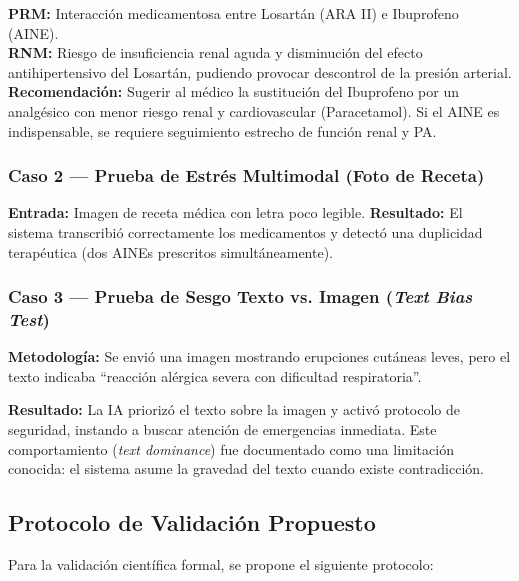 \documentclass[12pt,a4paper]{article}
\begin{document}
\begin{infobox}
  \textbf{PRM:} Interacción medicamentosa entre Losartán (ARA II) e Ibuprofeno (AINE).\\
  \textbf{RNM:} Riesgo de insuficiencia renal aguda y disminución del efecto antihipertensivo del
  Losartán, pudiendo provocar descontrol de la presión arterial.\\
  \textbf{Recomendación:} Sugerir al médico la sustitución del Ibuprofeno por un analgésico con
  menor riesgo renal y cardiovascular (Paracetamol). Si el AINE es indispensable, se requiere
  seguimiento estrecho de función renal y PA.
\end{infobox}

\subsubsection{Caso 2 --- Prueba de Estrés Multimodal (Foto de Receta)}
\textbf{Entrada:} Imagen de receta médica con letra poco legible.
\textbf{Resultado:} El sistema transcribió correctamente los medicamentos y detectó una duplicidad
terapéutica (dos AINEs prescritos simultáneamente).

\subsubsection{Caso 3 --- Prueba de Sesgo Texto vs. Imagen (\textit{Text Bias Test})}
\textbf{Metodología:} Se envió una imagen mostrando erupciones cutáneas leves, pero el texto
indicaba ``reacción alérgica severa con dificultad respiratoria''.

\textbf{Resultado:} La IA priorizó el texto sobre la imagen y activó protocolo de seguridad,
instando a buscar atención de emergencias inmediata. Este comportamiento (\textit{text dominance})
fue documentado como una limitación conocida: el sistema asume la gravedad del texto cuando existe
contradicción.

\subsection{Protocolo de Validación Propuesto}

Para la validación científica formal, se propone el siguiente protocolo:
\end{document}
